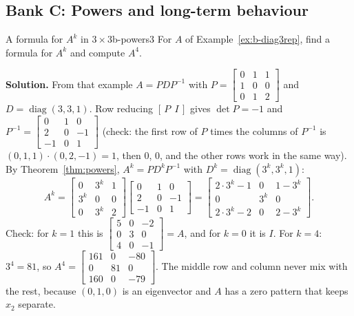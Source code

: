 \documentclass[11pt]{article}
\begin{document}
\subsection*{Bank C: Powers and long-term behaviour}
\begin{exmp}{A formula for $A^k$ in $3\times3$}{b-powers3}
For $A$ of Example~\ref{ex:b-diag3rep}, find a formula for $A^k$ and compute $A^4$.

\textbf{Solution.} From that example $A=PDP^{-1}$ with $P=\begin{bmatrix}0&1&1\\1&0&0\\0&1&2\end{bmatrix}$ and $D=\operatorname{diag}(3,3,1)$. Row reducing $[\,P\ \ I\,]$ gives $\det P=-1$ and $P^{-1}=\begin{bmatrix}0&1&0\\2&0&-1\\-1&0&1\end{bmatrix}$ (check: the first row of $P$ times the columns of $P^{-1}$ is $(0,1,1)\cdot(0,2,-1)=1$, then $0$, $0$, and the other rows work in the same way). By Theorem~\ref{thm:powers}, $A^k=PD^kP^{-1}$ with $D^k=\operatorname{diag}(3^k,3^k,1)$:
\[
A^k=\begin{bmatrix}0&3^k&1\\3^k&0&0\\0&3^k&2\end{bmatrix}\begin{bmatrix}0&1&0\\2&0&-1\\-1&0&1\end{bmatrix}=\begin{bmatrix}2\cdot3^k-1&0&1-3^k\\0&3^k&0\\2\cdot3^k-2&0&2-3^k\end{bmatrix}.
\]
Check: for $k=1$ this is $\begin{bmatrix}5&0&-2\\0&3&0\\4&0&-1\end{bmatrix}=A$, and for $k=0$ it is $I$. For $k=4$: $3^4=81$, so $A^4=\begin{bmatrix}161&0&-80\\0&81&0\\160&0&-79\end{bmatrix}$. The middle row and column never mix with the rest, because $(0,1,0)$ is an eigenvector and $A$ has a zero pattern that keeps $x_2$ separate.
\end{exmp}
\end{document}

